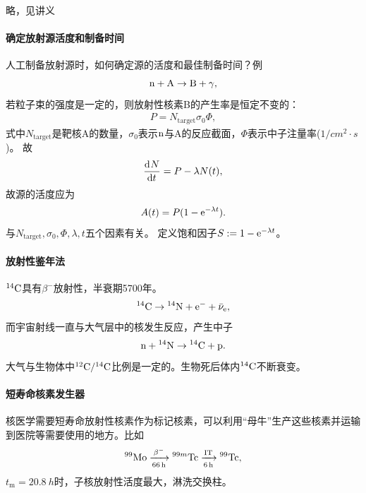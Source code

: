 略，见讲义

\paragraph{确定放射源活度和制备时间}

人工制备放射源时，如何确定源的活度和最佳制备时间？例
\[
	\mathrm n+\mathrm{A}\to\mathrm{B}+\gamma,
\]
若粒子束的强度是一定的，则放射性核素B的产生率是恒定不变的：
\begin{align}
	P=N_{\mathrm{target}}\sigma_0\Phi,
\end{align}
式中$N_{\mathrm{target}}$是靶核A的数量，$\sigma_0$表示$\mathrm n$与A的反应截面，$\Phi$表示中子注量率($\si{1/cm^2\cdot s}$)。
故
\[
	\frac{\mathrm{d}^{{}}N}{\mathrm{d}{t}^{{}}}=P-\lambda N(t),
\]
故源的活度应为
\begin{align}
	A(t)=P(1-\mathop{}\!\mathrm{e}^{-\lambda t}).
\end{align}
与$N_{\mathrm{target}},\sigma_0,\Phi,\lambda,t$五个因素有关。
定义饱和因子$S:=1-\mathop{}\!\mathrm{e}^{-\lambda t}$。

\paragraph{放射性鉴年法}

${^{14}\mathrm{C}}$具有$\beta^-$放射性，半衰期5700年。
\[
	{^{14}\mathrm{C}}\to{^{14}\mathrm{N}}+\mathrm e^-+\bar\nu_\mathrm e,
\]
而宇宙射线一直与大气层中的核发生反应，产生中子
\[
	\mathrm n+{^{14}\mathrm{N}}\to{^{14}\mathrm{C}}+\mathrm p.
\]
大气与生物体中${^{12}\mathrm{C}}/{^{14}\mathrm{C}}$比例是一定的。生物死后体内${^{14}\mathrm{C}}$不断衰变。
\paragraph{短寿命核素发生器}

核医学需要短寿命放射性核素作为标记核素，可以利用“母牛”生产这些核素并运输到医院等需要使用的地方。比如
\[
	{^{99}\mathrm{Mo}}\xrightarrow[\SI{66}{h}]{\beta^-}{^{99m}\mathrm{Tc}}\xrightarrow[\SI{6}{h}]{\mathrm{IT}}{^{99}\mathrm{Tc}},
\]
$t_\mathrm m=\SI{20.8}{h}$时，子核放射性活度最大，淋洗交换柱。

